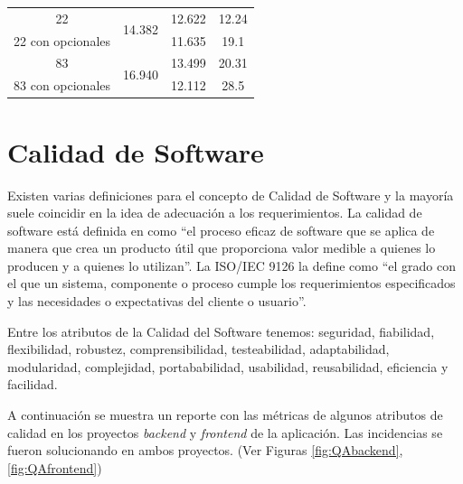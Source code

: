\begin{table}[tbp]
{\begin{tabular}{cccc}
22                 & \multirow{2}{*}{14.382}                                                           & 12.622                  & 12.24                                                                         \\
22 con opcionales  &                                                                                   & 11.635                  & 19.1                                                                          \\ \hline
83                 & \multirow{2}{*}{16.940}                                                           & 13.499                  & 20.31                                                                         \\
83 con opcionales  &                                                                                   & 12.112                  & 28.5                                                                          \\ \hline
\end{tabular}%
}
\end{table}

\section{Calidad de Software}

Existen varias definiciones para el concepto de Calidad de Software y la mayoría suele coincidir en la idea de adecuación a los requerimientos. La calidad de software está definida en \citet{Pressman2010IngenieriaPractico} como ``el proceso eficaz de software que se aplica de manera que crea un producto útil que proporciona valor medible a quienes lo producen y a quienes lo utilizan''. La ISO/IEC 9126 la define como ``el grado con el que un sistema, componente o proceso cumple los requerimientos especificados y las necesidades o expectativas del cliente o usuario''. 

Entre los atributos de la Calidad del Software tenemos: seguridad, fiabilidad, flexibilidad, robustez, comprensibilidad, testeabilidad, adaptabilidad, modularidad, complejidad, portababilidad, usabilidad, reusabilidad, eficiencia y facilidad.

A continuación se muestra un reporte con las métricas de algunos atributos de calidad en los proyectos \textit{backend} y \textit{frontend} de la aplicación. Las incidencias se fueron solucionando en ambos proyectos. (Ver Figuras \ref{fig:QAbackend}, \ref{fig:QAfrontend})

